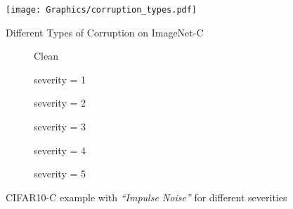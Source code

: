 \documentclass[a4paper, 11pt, oneside]{scrartcl}
\theoremstyle{break}
\numberwithin{equation}{section}
\begin{document}
		\begin{figure}[H]
			\centering
			\texttt{[image: Graphics/corruption\_types.pdf]}
			\caption{Different Types of Corruption on ImageNet-C \parencite{HD19}}
			\label{fig:corruption_types}
		\end{figure}

		\begin{figure}[H]
			\centering
			\hfill
			\begin{subfigure}{.16\textwidth}
				\centering
				Clean
			\end{subfigure}%
			\hfill
			\begin{subfigure}{.16\textwidth}
				\centering
				severity = 1
			\end{subfigure}%
			\hfill
			\begin{subfigure}{.16\textwidth}
				\centering
				severity = 2
			\end{subfigure}%
			\hfill
			\begin{subfigure}{.16\textwidth}
				\centering
				severity = 3
			\end{subfigure}%
			\hfill
			\begin{subfigure}{.16\textwidth}
				\centering
				severity = 4
			\end{subfigure}%
			\hfill
			\begin{subfigure}{.16\textwidth}
				\centering
				severity = 5
			\end{subfigure}%
			\caption{CIFAR10-C example with \emph{``Impulse Noise''} for different severities \parencite{HD19}}
			\label{fig:CIFAR10_corruption_severities}
		\end{figure}
\end{document}
